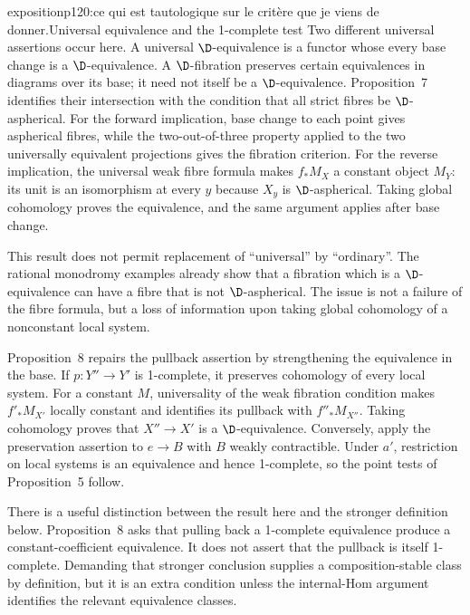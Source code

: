 \begin{dcomment}{exposition}{p120:ce qui est tautologique sur le critère que je viens de donner.}{Universal equivalence and the 1-complete test}
Two different universal assertions occur here. A universal $\D$-equivalence is a functor whose every base change is a $\D$-equivalence. A $\D$-fibration preserves certain equivalences in diagrams over its base; it need not itself be a $\D$-equivalence. Proposition~7 identifies their intersection with the condition that all strict fibres be $\D$-aspherical. For the forward implication, base change to each point gives aspherical fibres, while the two-out-of-three property applied to the two universally equivalent projections gives the fibration criterion. For the reverse implication, the universal weak fibre formula makes $f_*M_X$ a constant object $M_Y$: its unit is an isomorphism at every $y$ because $X_y$ is $\D$-aspherical. Taking global cohomology proves the equivalence, and the same argument applies after base change.

This result does not permit replacement of ``universal'' by ``ordinary''. The rational monodromy examples already show that a fibration which is a $\D$-equivalence can have a fibre that is not $\D$-aspherical. The issue is not a failure of the fibre formula, but a loss of information upon taking global cohomology of a nonconstant local system.

Proposition~8 repairs the pullback assertion by strengthening the equivalence in the base. If $p:Y''\to Y'$ is 1-complete, it preserves cohomology of every local system. For a constant $M$, universality of the weak fibration condition makes $f'_*M_{X'}$ locally constant and identifies its pullback with $f''_*M_{X''}$. Taking cohomology proves that $X''\to X'$ is a $\D$-equivalence. Conversely, apply the preservation assertion to $e\to B$ with $B$ weakly contractible. Under $a'$, restriction on local systems is an equivalence and hence 1-complete, so the point tests of Proposition~5 follow.

There is a useful distinction between the result here and the stronger definition below. Proposition~8 asks that pulling back a 1-complete equivalence produce a constant-coefficient equivalence. It does not assert that the pullback is itself 1-complete. Demanding that stronger conclusion supplies a composition-stable class by definition, but it is an extra condition unless the internal-Hom argument identifies the relevant equivalence classes.
\end{dcomment}

